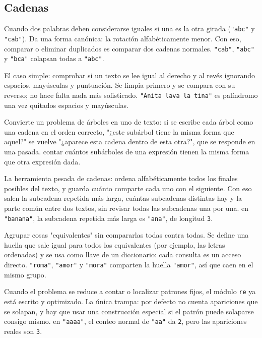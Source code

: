 \subsection*{Cadenas}

Cuando dos palabras deben considerarse iguales si una es la otra girada
(\texttt{"abc"} y \texttt{"cab"}). Da una forma canónica: la rotación
alfabéticamente menor. Con eso, comparar o eliminar duplicados es comparar dos
cadenas normales.
\ej \texttt{"cab"}, \texttt{"abc"} y \texttt{"bca"} colapsan todas a
\texttt{"abc"}.

El caso simple: comprobar si un texto se lee igual al derecho y al revés ignorando
espacios, mayúsculas y puntuación. Se limpia primero y se compara con su reverso;
no hace falta nada más sofisticado.
\ej \texttt{"Anita lava la tina"} es palíndromo una vez quitados espacios y
mayúsculas.

Convierte un problema de árboles en uno de texto: si se escribe cada árbol como una
cadena en el orden correcto, "¿este subárbol tiene la misma forma que aquel?" se
vuelve "¿aparece esta cadena dentro de esta otra?", que se responde en una pasada.
\ej contar cuántos subárboles de una expresión tienen la misma forma que otra
expresión dada.

La herramienta pesada de cadenas: ordena alfabéticamente todos los finales posibles
del texto, y guarda cuánto comparte cada uno con el siguiente. Con eso salen la
subcadena repetida más larga, cuántas subcadenas distintas hay y la parte común
entre dos textos, sin revisar todas las subcadenas una por una.
\ej en \texttt{"banana"}, la subcadena repetida más larga es \texttt{"ana"}, de
longitud \texttt{3}.

Agrupar cosas "equivalentes" sin compararlas todas contra todas. Se define una
huella que sale igual para todos los equivalentes (por ejemplo, las letras
ordenadas) y se usa como llave de un diccionario: cada consulta es un acceso
directo.
\ej \texttt{"roma"}, \texttt{"amor"} y \texttt{"mora"} comparten la huella
\texttt{"amor"}, así que caen en el mismo grupo.

Cuando el problema se reduce a contar o localizar patrones fijos, el módulo
\texttt{re} ya está escrito y optimizado. La única trampa: por defecto no cuenta
apariciones que se solapan, y hay que usar una construcción especial si el patrón
puede solaparse consigo mismo.
\ej en \texttt{"aaaa"}, el conteo normal de \texttt{"aa"} da \texttt{2}, pero las
apariciones reales son \texttt{3}.

